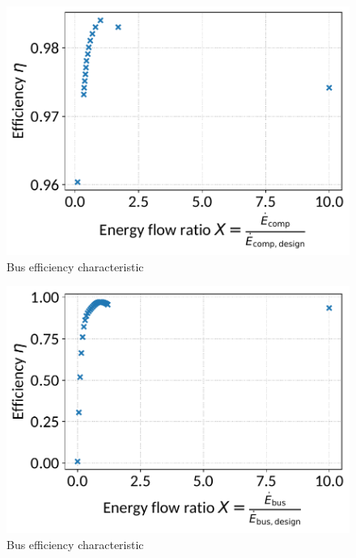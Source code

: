 \documentclass[]{article}
\begin{document}
\begin{minipage}{0.5\textwidth}
\begin{figure}[H]\begin{center}
\includegraphics[width=\textwidth]{figures/Bus_CharLine_gas_turbineoffdesign.pdf}
\caption{Bus efficiency characteristic}
\label{fig:Bus_CharLine_gas turbineoffdesign}
\end{center}\end{figure}

\end{minipage}
\begin{minipage}{0.5\textwidth}
\begin{figure}[H]\begin{center}
\includegraphics[width=\textwidth]{figures/Bus_CharLine_fuel_compressoroffdesign.pdf}
\caption{Bus efficiency characteristic}
\label{fig:Bus_CharLine_fuel compressoroffdesign}
\end{center}\end{figure}

\end{minipage}
\end{document}
